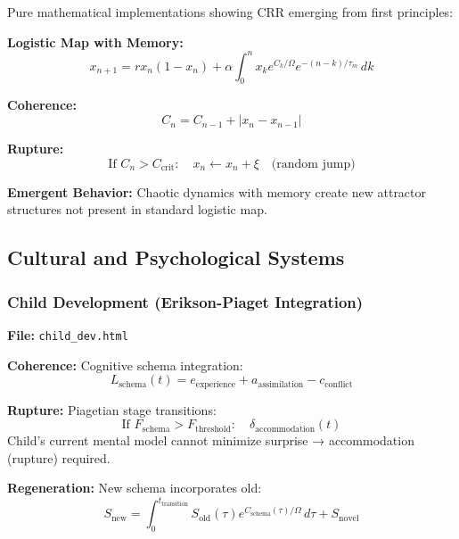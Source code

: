 \documentclass[11pt,a4paper]{article}
\theoremstyle{definition}
\theoremstyle{remark}
\begin{document}
Pure mathematical implementations showing CRR emerging from first principles:

\textbf{Logistic Map with Memory:}
\begin{equation}
x_{n+1} = r x_n(1-x_n) + \alpha \int_0^n x_k e^{C_k/\Omega} e^{-(n-k)/\tau_m}\,dk
\end{equation}

\textbf{Coherence:}
\begin{equation}
C_n = C_{n-1} + |x_n - x_{n-1}|
\end{equation}

\textbf{Rupture:}
\begin{equation}
\text{If } C_n > C_{\text{crit}}: \quad x_n \gets x_n + \xi \quad \text{(random jump)}
\end{equation}

\textbf{Emergent Behavior:} Chaotic dynamics with memory create new attractor structures not present in standard logistic map.

\subsection{Cultural and Psychological Systems}

\subsubsection{Child Development (Erikson-Piaget Integration)}

\textbf{File:} \texttt{child\_dev.html}

\textbf{Coherence:} Cognitive schema integration:
\begin{equation}
L_{\text{schema}}(t) = e_{\text{experience}} + a_{\text{assimilation}} - c_{\text{conflict}}
\end{equation}

\textbf{Rupture:} Piagetian stage transitions:
\begin{equation}
\text{If } F_{\text{schema}} > F_{\text{threshold}}: \quad \delta_{\text{accommodation}}(t)
\end{equation}
Child's current mental model cannot minimize surprise → accommodation (rupture) required.

\textbf{Regeneration:} New schema incorporates old:
\begin{equation}
S_{\text{new}} = \int_0^{t_{\text{transition}}} S_{\text{old}}(\tau) e^{C_{\text{schema}}(\tau)/\Omega}\,d\tau + S_{\text{novel}}
\end{equation}
\end{document}
